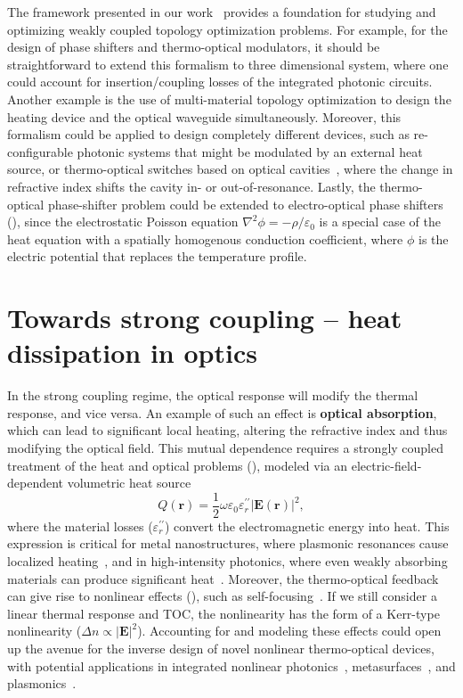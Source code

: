The framework presented in our work~\cite{ownpub0} provides a foundation for studying and optimizing weakly coupled topology optimization problems. For example, for the design of phase shifters and thermo-optical modulators, it should be straightforward to extend this
formalism to three dimensional system, where one could account for insertion/coupling losses of the integrated photonic circuits. Another example is the use of multi-material topology optimization to design the heating device and the optical waveguide simultaneously. Moreover, this formalism could be applied to design completely different devices, such as re-configurable photonic systems that might be modulated by an external heat source, or thermo-optical
switches based on optical cavities~\cite{switch, switch_2}, where the change in refractive index shifts the cavity in- or out-of-resonance. Lastly, the thermo-optical phase-shifter problem could be
extended to electro-optical phase shifters~\cite{pockels} (), since the electrostatic Poisson equation $\nabla^2 \phi = -\rho/\varepsilon_0$ is a special case of the heat equation with a spatially homogenous
conduction coefficient, where $\phi$ is the electric potential that replaces the temperature profile. 

\section{Towards strong coupling -- heat dissipation in optics}\label{sec:thermo_strong_coupling}

In the strong coupling regime, the optical response will modify the thermal response, and vice versa.
An example of such an effect is \textbf{optical absorption}, which can lead to significant local heating, altering the refractive index and thus modifying the optical field. 
This mutual dependence requires a strongly coupled treatment of the heat and optical problems (), modeled via an electric-field-dependent volumetric heat source~\cite{plasm_heat_source}
\[
Q(\mathbf{r}) = \frac{1}{2} \omega \varepsilon_0 \varepsilon_r^{\prime \prime} |\mathbf{E}(\mathbf{r})|^2,
\]
where the material losses ($\varepsilon_r^{\prime \prime}$) convert the electromagnetic energy into heat. 
This expression is critical for metal nanostructures, where plasmonic resonances cause localized heating~\cite{plasm_heat_source}, and in high-intensity photonics, where even weakly absorbing materials can produce significant heat~\cite{thermal_nl, high_I_T}. Moreover, the thermo-optical feedback can give rise to nonlinear effects (), such as self-focusing~\cite{thermal_nl}. If we still consider a linear
thermal response and TOC,
the nonlinearity has the form of a Kerr-type nonlinearity ($\Delta n \propto \vert \mathbf{E} \vert^2$). Accounting for and modeling
these effects could open up the avenue for the inverse design of novel nonlinear thermo-optical devices, with potential applications
in integrated nonlinear photonics~\cite{nl_photonics}, metasurfaces~\cite{nl_meta}, and plasmonics~\cite{novotny}.

